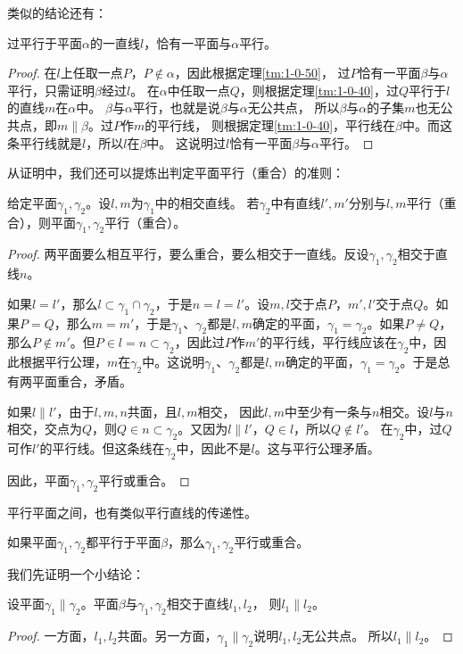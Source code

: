 \documentclass[12pt,UTF8]{ctexbook}
\begin{document}
类似的结论还有：

\begin{tm}\label{tm:1-0-60}
    过平行于平面$\alpha$的一直线$l$，恰有一平面与$\alpha$平行。
\end{tm}
\begin{proof}
在$l$上任取一点$P$，$P\notin \alpha$，因此根据定理\ref{tm:1-0-50}，
过$P$恰有一平面$\beta$与$\alpha$平行，只需证明$\beta$经过$l$。
在$\alpha$中任取一点$Q$，则根据定理\ref{tm:1-0-40}，过$Q$平行于$l$的直线$m$在$\alpha$中。
$\beta$与$\alpha$平行，也就是说$\beta$与$\alpha$无公共点，
所以$\beta$与$\alpha$的子集$m$也无公共点，即$m\parallel \beta$。过$P$作$m$的平行线，
则根据定理\ref{tm:1-0-40}，平行线在$\beta$中。而这条平行线就是$l$，所以$l$在$\beta$中。
这说明过$l$恰有一平面$\beta$与$\alpha$平行。
\end{proof}

从证明中，我们还可以提炼出判定平面平行（重合）的准则：

\begin{tm}\label{tm:1-0-70}
    给定平面$\gamma_1, \gamma_2$。设$l,m$为$\gamma_1$中的相交直线。
    若$\gamma_2$中有直线$l',m'$分别与$l,m$平行（重合），则平面$\gamma_1, \gamma_2$平行（重合）。
\end{tm}
\begin{proof}
    两平面要么相互平行，要么重合，要么相交于一直线。反设$\gamma_1, \gamma_2$相交于直线$n$。

    如果$l=l'$，那么$l\subset \gamma_1\cap\gamma_2$，于是$n=l=l'$。设$m,l$交于点$P$，$m',l'$交于点$Q$。如果$P=Q$，那么$m=m'$，于是$\gamma_1$、$\gamma_2$都是$l,m$确定的平面，$\gamma_1=\gamma_2$。如果$P\neq Q$，那么$P\notin m'$。但$P\in l=n\subset\gamma_2$，因此过$P$作$m'$的平行线，平行线应该在$\gamma_2$中，因此根据平行公理，$m$在$\gamma_2$中。这说明$\gamma_1$、$\gamma_2$都是$l,m$确定的平面，$\gamma_1=\gamma_2$。于是总有两平面重合，矛盾。

    如果$l\parallel l'$，由于$l,m,n$共面，且$l,m$相交，
    因此$l,m$中至少有一条与$n$相交。设$l$与$n$相交，交点为$Q$，则$Q\in n\subset\gamma_2$。又因为$l\parallel l'$，$Q\in l$，所以$Q\notin l'$。
    在$\gamma_2$中，过$Q$可作$l'$的平行线。但这条线在$\gamma_2$中，因此不是$l$。这与平行公理矛盾。

    因此，平面$\gamma_1, \gamma_2$平行或重合。
\end{proof}

平行平面之间，也有类似平行直线的传递性。
\begin{tm}\label{tm:1-0-80}
如果平面$\gamma_1,\gamma_2$都平行于平面$\beta$，那么$\gamma_1,\gamma_2$平行或重合。
\end{tm}
我们先证明一个小结论：
\begin{tm}\label{tm:1-0-90}
    设平面$\gamma_1\parallel \gamma_2$。平面$\beta$与$\gamma_1,\gamma_2$相交于直线$l_1,l_2$，
    则$l_1\parallel l_2$。
\end{tm}
\begin{proof}
    一方面，$l_1,l_2$共面。另一方面，$\gamma_1\parallel \gamma_2$说明$l_1,l_2$无公共点。
    所以$l_1\parallel l_2$。
\end{proof}
\end{document}

